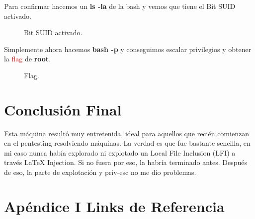 \documentclass[a4paper]{article} %
\begin{document}
    Para confirmar hacemos un \textbf{ls -la} de la bash y vemos que tiene el Bit SUID activado.

    \begin{figure}[h] %
        \begin{center}
        \setlength{\fboxsep}{0.2em} %
        \end{center}
        \captionsetup{labelfont=bf} %
        \caption{Bit SUID activado.}
    \end{figure}

    Simplemente ahora hacemos \textbf{bash -p} y conseguimos escalar privilegios y obtener la \textcolor{red}{flag} de \textbf{root}.

    \begin{figure}[h] %
        \begin{center}
        \setlength{\fboxsep}{0.2em} %
        \end{center}
        \captionsetup{labelfont=bf} %
        \caption{Flag.}
    \end{figure}

\vspace{5cm}

\section{Conclusión Final}

Esta máquina resultó muy entretenida, ideal para aquellos que recién comienzan en el pentesting resolviendo máquinas. La verdad es que fue bastante sencilla, en mi caso nunca había explorado ni explotado un Local File Inclusion (LFI) a través LaTeX Injection. Si no fuera por eso, la habría terminado antes. Después de eso, la parte de explotación y priv-esc no me dio problemas.

\section{Apéndice I Links de Referencia}
\end{document}
